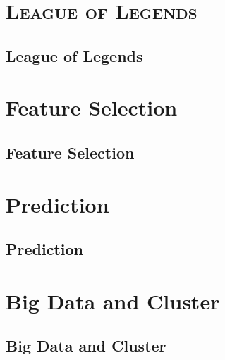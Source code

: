 \documentclass[xcolor=x11names,compress]{beamer}
\renewcommand{\(}{\begin{columns}}
\renewcommand{\)}{\end{columns}}
\newcommand{\<}[1]{\begin{column}{#1}}
\renewcommand{\>}{\end{column}}
\begin{document}
	
	\section{\scshape League of Legends}
	\subsection{League of Legends}
	
	\section{Feature Selection}
	\subsection{Feature Selection}
		
	\section{Prediction}
	\subsection{Prediction}
	
	\section{Big Data and Cluster}
	\subsection{Big Data and Cluster}
	
\end{document}
